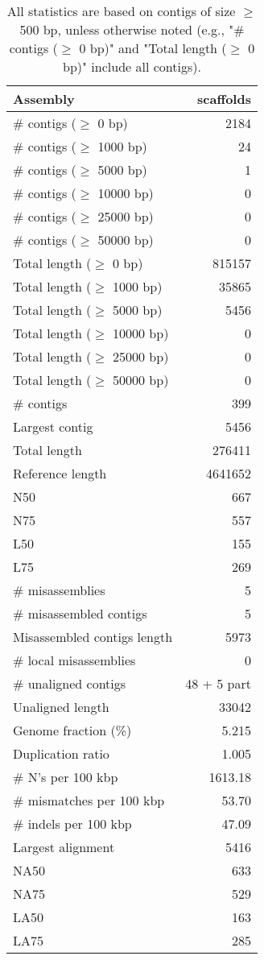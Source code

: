 \documentclass[12pt,a4paper]{article}
\begin{document}
\begin{table}[ht]
\begin{center}
\caption{All statistics are based on contigs of size $\geq$ 500 bp, unless otherwise noted (e.g., "\# contigs ($\geq$ 0 bp)" and "Total length ($\geq$ 0 bp)" include all contigs).}
\begin{tabular}{|l*{1}{|r}|}
\hline
Assembly & scaffolds \\ \hline
\# contigs ($\geq$ 0 bp) & 2184 \\ \hline
\# contigs ($\geq$ 1000 bp) & 24 \\ \hline
\# contigs ($\geq$ 5000 bp) & 1 \\ \hline
\# contigs ($\geq$ 10000 bp) & 0 \\ \hline
\# contigs ($\geq$ 25000 bp) & 0 \\ \hline
\# contigs ($\geq$ 50000 bp) & 0 \\ \hline
Total length ($\geq$ 0 bp) & 815157 \\ \hline
Total length ($\geq$ 1000 bp) & 35865 \\ \hline
Total length ($\geq$ 5000 bp) & 5456 \\ \hline
Total length ($\geq$ 10000 bp) & 0 \\ \hline
Total length ($\geq$ 25000 bp) & 0 \\ \hline
Total length ($\geq$ 50000 bp) & 0 \\ \hline
\# contigs & 399 \\ \hline
Largest contig & 5456 \\ \hline
Total length & 276411 \\ \hline
Reference length & 4641652 \\ \hline
N50 & 667 \\ \hline
N75 & 557 \\ \hline
L50 & 155 \\ \hline
L75 & 269 \\ \hline
\# misassemblies & 5 \\ \hline
\# misassembled contigs & 5 \\ \hline
Misassembled contigs length & 5973 \\ \hline
\# local misassemblies & 0 \\ \hline
\# unaligned contigs & 48 + 5 part \\ \hline
Unaligned length & 33042 \\ \hline
Genome fraction (\%) & 5.215 \\ \hline
Duplication ratio & 1.005 \\ \hline
\# N's per 100 kbp & 1613.18 \\ \hline
\# mismatches per 100 kbp & 53.70 \\ \hline
\# indels per 100 kbp & 47.09 \\ \hline
Largest alignment & 5416 \\ \hline
NA50 & 633 \\ \hline
NA75 & 529 \\ \hline
LA50 & 163 \\ \hline
LA75 & 285 \\ \hline
\end{tabular}
\end{center}
\end{table}
\end{document}
